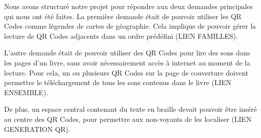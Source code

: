 \par
Nous avons structuré notre projet pour répondre aux deux demandes principales qui nous ont été faites. La première demande était de pouvoir utiliser les QR Codes comme légendes de cartes de géographie. Cela implique de pouvoir gérer la lecture de QR Codes adjacents dans un ordre prédéfini (LIEN FAMILLES).\\

\par
L'autre demande était de pouvoir utiliser des QR Codes pour lire des sons dans les pages d'un livre, sans avoir nécessairement accès à internet au moment de la lecture. Pour cela, un ou plusieurs QR Codes sur la page de couverture doivent permettre le téléchargement de tous les sons contenus dans le livre (LIEN ENSEMBLE).\\

\par
De plus, un espace central contenant du texte en braille devait pouvoir être inséré au centre des QR Codes, pour permettre aux non-voyants de les localiser (LIEN GENERATION QR).